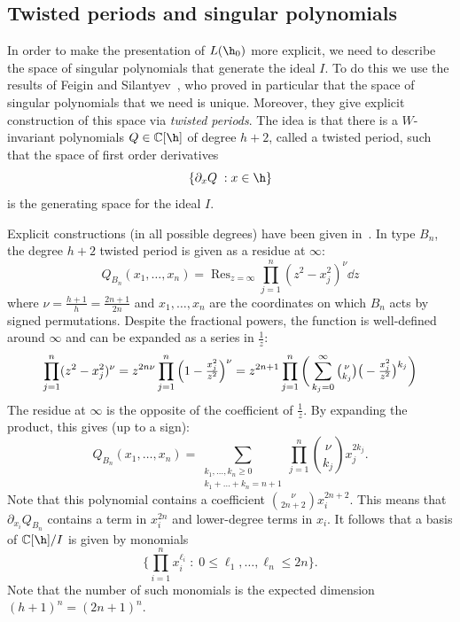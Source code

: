 \documentclass[11pt]{article}
\theoremstyle{definition}
\begin{document}
\subsection{Twisted periods and singular polynomials}

In order to make the presentation of $L(\h_0)$ more explicit, we need to describe the space of singular polynomials that generate the ideal $I$.  To do this we use the results of Feigin and Silantyev~\cite{feiginsilantyev}, who proved in particular that the space of singular polynomials that we need is unique.  Moreover, they give explicit construction of this space via {\it twisted periods}.  The idea is that there is a $W$-invariant polynomials $Q\in \mathbb{C}[\h]$ of degree $h+2$, called a twisted period, such that the space of first order derivatives 
\[
    \{ \partial_x Q \;: x\in \h \}
\]
is the generating space for the ideal $I$.  

Explicit constructions (in all possible degrees) have been given in~\cite[Section~5]{feiginsilantyev}.  In type $B_n$, the degree $h+2$ twisted period is given as a residue at $\infty$:
\[
    Q_{B_n} (x_1,\dots,x_n)
        =
    \operatorname{Res}_{z=\infty}
        \prod_{j=1}^n (z^2 - x_j^2)^{\nu} \dd{z}
\]
where $\nu = \frac{h+1}{h} = \frac{2n+1}{2n}$ and $x_1,\dots,x_n$ are the coordinates on which $B_n$ acts by signed permutations. Despite the fractional powers, the function is well-defined around $\infty$ and can be expanded as a series in $\frac{1}{z}$:  
\[
    \prod_{j=1}^n (z^2 - x_j^2)^{\nu} 
        =
    z^{2n\nu} \prod_{j=1}^n \Big(1 - \tfrac{x_j^2}{z^2}\Big)^{\nu} 
        =
    z^{2n+1} \prod_{j=1}^n \bigg(
        \sum_{k_j=0}^{\infty}
        \tbinom{\nu}{k_j}\big(-\tfrac{x_j^2}{z^2} \big)^{k_j} \bigg)
\]
The residue at $\infty$ is the opposite of the coefficient of $\tfrac{1}{z}$.  By expanding the product, this gives (up to a sign):
\[
    Q_{B_n}(x_1,\dots,x_n)
        =
    \sum_{\substack{ k_1,\dots,k_n \geq 0 \\ k_1 + \dots + k_n = n+1}} \prod_{j=1}^n \binom{\nu}{k_j} x_j^{2k_j}.
\]
Note that this polynomial contains a coefficient $\binom{\nu}{2n+2}x_i^{2n+2}$.  This means that $\partial_{x_i} Q_{B_n}$ contains a term in $x_i^{2n}$ and lower-degree terms in $x_i$.  It follows that a basis of $\mathbb{C}[\h]/I$ is given by monomials
\[
    \Big\{
        \prod_{i=1}^n x_i^{\ell_i} 
        \;:\;
        0\leq \ell_1,\dots,\ell_n \leq 2n
    \Big\}.
\]
Note that the number of such monomials is the expected dimension $(h+1)^n = (2n+1)^n$.
\end{document}
